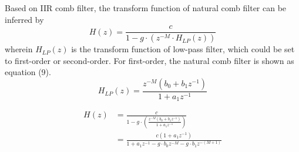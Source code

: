 \documentclass[a4paper]{tufte-handout} %
\begin{document}
Based on IIR comb filter, the transform function of natural comb filter can be inferred by
\begin{equation}
H(z)=\frac{c}{1-g \cdot (z^{-M} \cdot H_{LP}(z))}
\end{equation}
wherein $H_{LP}(z)$ is the transform function of low-pass filter, which could be set to first-order or second-order. For first-order, the natural comb filter is shown as equation (9).
\begin{equation}
  H_{LP}(z)=\frac{z^{-M}(b_0+b_1z^{-1})}{1+a_1z^{-1}}
\end{equation}

\begin{equation}
\begin{aligned}
  H(z)&=\frac{c}{1-g \cdot (\frac{z^{-M}(b_0+b_1z^{-1})}{1+a_1z^{-1}})} \\
  &=\frac{c(1+a_1z^{-1})}{1+a_1z^{-1}-g \cdot b_0z^{-M}-g \cdot b_1z^{-(M+1)}}
\end{aligned}
\end{equation}
\end{document}
